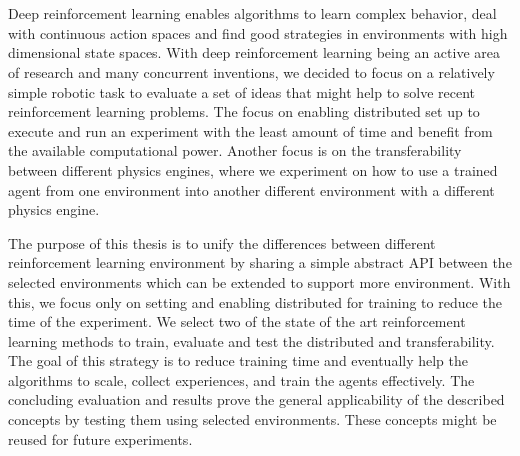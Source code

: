 \chapter{\abstractname}
Deep reinforcement learning enables algorithms to learn complex behavior, deal with continuous action spaces and find good strategies in environments with high dimensional state spaces. With deep reinforcement learning being an active area of research and many concurrent inventions, we decided to focus on a relatively simple robotic task to evaluate a set of ideas that might help to solve recent reinforcement learning problems. The focus on enabling distributed set up to execute and run an experiment with the least amount of time and benefit from the available computational power. Another focus is on the transferability between different physics engines, where we experiment on how to use a trained agent from one environment into another different environment with a different physics engine.

The purpose of this thesis is to unify the differences between different reinforcement learning environment by sharing a simple abstract API between the selected environments which can be extended to support more environment. With this, we focus only on setting and enabling distributed for training to reduce the time of the experiment. We select two of the state of the art reinforcement learning methods to train, evaluate and test the distributed and transferability. The goal of this strategy is to reduce training time and eventually help the algorithms to scale, collect experiences, and train the agents effectively. The concluding evaluation and results prove the general applicability of the described concepts by testing them using selected environments. These concepts might be reused for future experiments.